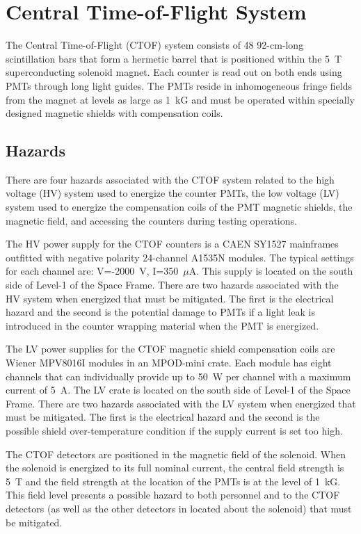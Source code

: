\section{Central Time-of-Flight System}

The Central Time-of-Flight (CTOF) system consists of 48 92-cm-long scintillation bars 
that form a hermetic barrel that is positioned within the 5~T superconducting solenoid 
magnet. Each counter is read out on both ends using PMTs through long light guides. 
The PMTs reside in inhomogeneous fringe fields from the magnet at levels as large as 
1~kG and must be operated within specially designed magnetic shields with compensation 
coils.

\subsection{Hazards} 

There are four hazards associated with the CTOF system related to the high voltage (HV) 
system used to energize the counter PMTs, the low voltage (LV) system used to energize the 
compensation coils of the PMT magnetic shields, the magnetic field, and accessing the 
counters during testing operations.

The HV power supply for the CTOF counters is a CAEN SY1527 mainframes outfitted with negative 
polarity 24-channel A1535N modules. The typical settings for each channel are: V=-2000~V,
I=350~$\mu$A. This supply is located on the south side of Level-1 of the Space Frame. There 
are two hazards associated with the HV system when energized that must be mitigated. The first
is the electrical hazard and the second is the potential damage to PMTs if a light leak is
introduced in the counter wrapping material when the PMT is energized.

The LV power supplies for the CTOF magnetic shield compensation coils are Wiener MPV8016I 
modules in an MPOD-mini crate. Each module has eight channels that can individually provide 
up to 50~W per channel with a maximum current of 5~A. The LV crate is located on the south 
side of Level-1 of the Space Frame. There are two hazards associated with the LV system when 
energized that must be mitigated. The first is the electrical hazard and the second is the 
possible shield over-temperature condition if the supply current is set too high.

The CTOF detectors are positioned in the magnetic field of the solenoid. When the solenoid is 
energized to its full nominal current, the central field strength is 5~T and the field strength 
at the location of the PMTs is at the level of 1~kG. This field level presents a possible hazard
to both personnel and to the CTOF detectors (as well as the other detectors in located about
the solenoid) that must be mitigated.

